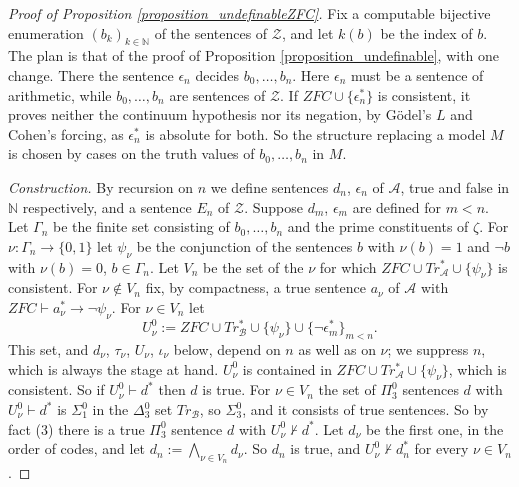 \documentclass{amsart}  %
\numberwithin{equation}{section}
\theoremstyle{definition}
\theoremstyle{remark}
\begin{document}
\begin{proof} [Proof of Proposition \ref{proposition_undefinableZFC}]
Fix a computable bijective enumeration $(b _{k}) _{k \in \mathbb{N}}$ of the sentences of $\mathcal{Z}$, and let $k (b)$ be the index of $b$. The plan is that of the proof of Proposition \ref{proposition_undefinable}, with one change. There the sentence $\epsilon _{n}$ decides $b _{0}, \ldots, b _{n}$. Here $\epsilon _{n}$ must be a sentence of arithmetic, while $b _{0}, \ldots, b _{n}$ are sentences of $\mathcal{Z}$. If $ZFC \cup \{\epsilon _{n} ^{\ast}\}$ is consistent, it proves neither the continuum hypothesis nor its negation, by G\"odel's $L$ and Cohen's forcing, as $\epsilon _{n} ^{\ast}$ is absolute for both. So the structure replacing a model $M$ is chosen by cases on the truth values of $b _{0}, \ldots, b _{n}$ in $M$.

\emph{Construction.} By recursion on $n$ we define sentences $d _{n}$, $\epsilon _{n}$ of $\mathcal{A}$, true and false in $\mathbb{N}$ respectively, and a sentence $E _{n}$ of $\mathcal{Z}$. Suppose $d _{m}$, $\epsilon _{m}$ are defined for $m < n$. Let $\Gamma _{n}$ be the finite set consisting of $b _{0}, \ldots, b _{n}$ and the prime constituents of $\zeta$. For $\nu: \Gamma _{n} \to \{0,1\}$ let $\psi _{\nu}$ be the conjunction of the sentences $b$ with $\nu (b) = 1$ and $\neg b$ with $\nu (b) = 0$, $b \in \Gamma _{n}$. Let $V _{n}$ be the set of the $\nu$ for which $ZFC \cup Tr _{\mathcal{A}} ^{\ast} \cup \{\psi _{\nu}\}$ is consistent. For $\nu \notin V _{n}$ fix, by compactness, a true sentence $a _{\nu}$ of $\mathcal{A}$ with $ZFC \vdash a _{\nu} ^{\ast} \to \neg \psi _{\nu}$. For $\nu \in V _{n}$ let
$$U ^{0} _{\nu} := ZFC \cup Tr _{\mathcal{B}} ^{\ast} \cup \{\psi _{\nu}\} \cup \{\neg \epsilon _{m} ^{\ast}\} _{m < n}.$$
This set, and $d _{\nu}$, $\tau _{\nu}$, $U _{\nu}$, $\iota _{\nu}$ below, depend on $n$ as well as on $\nu$; we suppress $n$, which is always the stage at hand. $U ^{0} _{\nu}$ is contained in $ZFC \cup Tr _{\mathcal{A}} ^{\ast} \cup \{\psi _{\nu}\}$, which is consistent. So if $U ^{0} _{\nu} \vdash d ^{\ast}$ then $d$ is true. For $\nu \in V _{n}$ the set of $\Pi ^{0} _{3}$ sentences $d$ with $U ^{0} _{\nu} \vdash d ^{\ast}$ is $\Sigma ^{0} _{1}$ in the $\Delta ^{0} _{3}$ set $Tr _{\mathcal{B}}$, so $\Sigma ^{0} _{3}$, and it consists of true sentences. So by fact (3) there is a true $\Pi ^{0} _{3}$ sentence $d$ with $U ^{0} _{\nu} \nvdash d ^{\ast}$. Let $d _{\nu}$ be the first one, in the order of codes, and let $d _{n} := \bigwedge _{\nu \in V _{n}} d _{\nu}$. So $d _{n}$ is true, and $U ^{0} _{\nu} \nvdash d _{n} ^{\ast}$ for every $\nu \in V _{n}$.


\end{proof}
\end{document}
